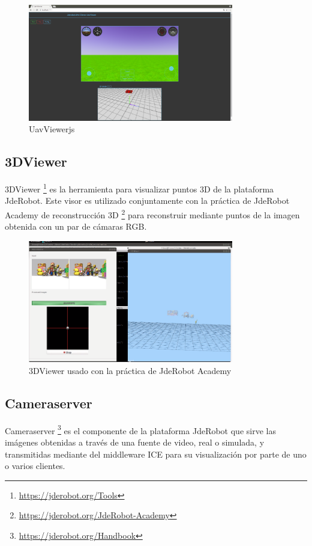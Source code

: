 \begin{figure}[H]
  \begin{center}
    \includegraphics[width=0.8\textwidth]{figures/uavviewerjs.png}
		\caption{UavViewerjs}
		\label{fig.uavviewerjs}
		\end{center}
\end{figure}

\subsection{3DViewer}
3DViewer \footnote{\url{https://jderobot.org/Tools}} es la herramienta para visualizar puntos 3D de la plataforma JdeRobot. Este visor es utilizado conjuntamente con la práctica de JdeRobot Academy de reconstrucción 3D \footnote{\url{https://jderobot.org/JdeRobot-Academy}} para reconstruir mediante puntos de la imagen obtenida con un par de cámaras RGB.

\begin{figure}[H]
  \begin{center}
    \includegraphics[width=0.8\textwidth]{figures/3DViewer.png}
		\caption{3DViewer usado con la práctica de JdeRobot Academy}
		\label{fig.3DViewer}
		\end{center}
\end{figure}
\subsection{Cameraserver}
Cameraserver \footnote{\url{https://jderobot.org/Handbook}} es el componente de la plataforma JdeRobot que sirve las imágenes obtenidas a través de una fuente de video, real o simulada, y transmitidas mediante del middleware ICE para su visualización por parte de uno o varios clientes.
